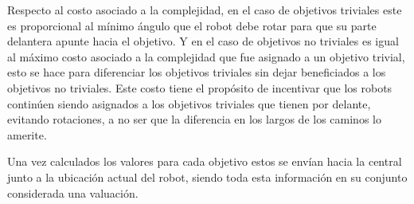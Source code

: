 Respecto al costo asociado a la complejidad, en el caso de objetivos triviales
este es proporcional al mínimo ángulo que el robot debe rotar para que su parte
delantera apunte hacia el objetivo. Y en el caso de objetivos no triviales es
igual al máximo costo asociado a la complejidad que fue asignado a un objetivo
trivial, esto se hace para diferenciar los objetivos triviales sin dejar
beneficiados a los objetivos no triviales. Este costo tiene el propósito de
incentivar que los robots continúen siendo asignados a los objetivos triviales que
tienen por delante, evitando rotaciones, a no ser que la diferencia en los largos de
los caminos lo amerite.

Una vez calculados los valores para cada objetivo estos se envían hacia la central
junto a la ubicación actual del robot, siendo toda esta información en su
conjunto considerada una valuación. %






